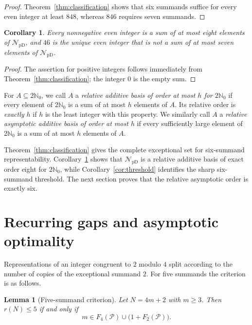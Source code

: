 \documentclass[12pt]{article}
\theoremstyle{plain}
\newtheorem{lemma}[theorem]{Lemma}
\newtheorem{corollary}[theorem]{Corollary}
\theoremstyle{definition}
\theoremstyle{plain}
\newcommand{\NpD}{\mathcal{N}_{\mathrm{pD}}}
\newcommand{\Pset}{\mathcal{P}}
\begin{document}
\begin{proof}
Theorem~\ref{thm:classification} shows that six summands suffice for every even
integer at least $848$, whereas $846$ requires seven summands.
\end{proof}

\begin{corollary}\label{cor:eight}
Every nonnegative even integer is a sum of at most eight elements of
$\NpD$, and $46$ is the unique even integer that is not a sum of at most
seven elements of $\NpD$.
\end{corollary}

\begin{proof}
The assertion for positive integers follows immediately from
Theorem~\ref{thm:classification}; the integer $0$ is the empty sum.
\end{proof}


For $A\subseteq2\mathbb N_0$, we call $A$ a \emph{relative additive basis of
order at most $h$ for $2\mathbb N_0$} if every element of $2\mathbb N_0$ is a
sum of at most $h$ elements of $A$.  Its relative order is \emph{exactly $h$}
if $h$ is the least integer with this property.  We similarly call $A$ a
\emph{relative asymptotic additive basis of order at most $h$} if every
sufficiently large element of $2\mathbb N_0$ is a sum of at most $h$ elements
of $A$.

Theorem~\ref{thm:classification} gives the complete exceptional set for
six-summand representability.  Corollary~\ref{cor:eight} shows that $\NpD$ is
a relative additive basis of exact order eight for $2\mathbb N_0$, while
Corollary~\ref{cor:threshold} identifies the sharp six-summand threshold.
The next section proves that the relative asymptotic order is exactly six.


\section{Recurring gaps and asymptotic optimality}\label{sec:asymptotic}

Representations of an integer congruent to $2$ modulo $4$ split according to
the number of copies of the exceptional summand $2$.  For five summands the
criterion is as follows.

\begin{lemma}[Five-summand criterion]\label{lem:fivecrit}
Let $N=4m+2$ with $m\geq3$.  Then $r(N)\leq5$ if and only if
\begin{equation}\label{eq:fivecrit}
  m\in F_4(\Pset)\cup\bigl(1+F_2(\Pset)\bigr).
\end{equation}
\end{lemma}
\end{document}
